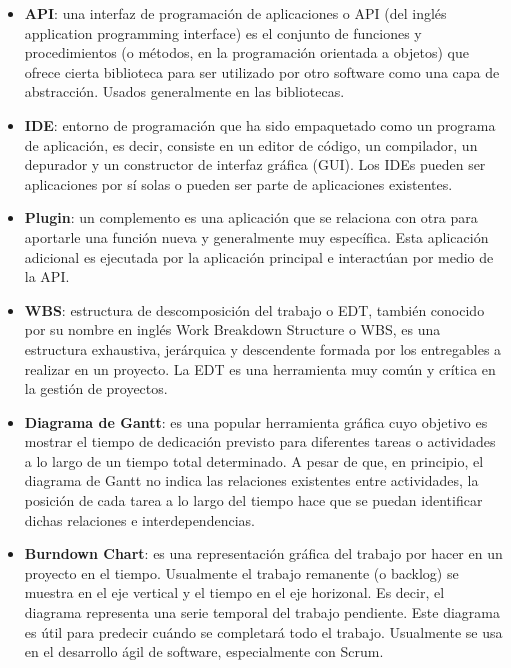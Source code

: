 \documentclass[12pt,a4paper]{article}
\begin{document}
\begin{itemize}

\item \textbf{API}: una interfaz de programación de aplicaciones o API (del inglés application programming interface) es el conjunto de funciones y procedimientos (o métodos, en la programación orientada a objetos) que ofrece cierta biblioteca para ser utilizado por otro software como una capa de abstracción. Usados generalmente en las bibliotecas.

\item \textbf{IDE}: entorno de programación que ha sido empaquetado como un programa de aplicación, es decir, consiste en un editor de código, un compilador, un depurador y un constructor de interfaz gráfica (GUI). Los IDEs pueden ser aplicaciones por sí solas o pueden ser parte de aplicaciones existentes.

\item \textbf{Plugin}: un complemento es una aplicación que se relaciona con otra para aportarle una función nueva y generalmente muy específica. Esta aplicación adicional es ejecutada por la aplicación principal e interactúan por medio de la API.

\item \textbf{WBS}: estructura de descomposición del trabajo o EDT, también conocido por su nombre en inglés Work Breakdown Structure o WBS, es una estructura exhaustiva, jerárquica y descendente formada por los entregables a realizar en un proyecto. La EDT es una herramienta muy común y crítica en la gestión de proyectos.

\item \textbf{Diagrama de Gantt}: es una popular herramienta gráfica cuyo objetivo es mostrar el tiempo de dedicación previsto para diferentes tareas o actividades a lo largo de un tiempo total determinado. A pesar de que, en principio, el diagrama de Gantt no indica las relaciones existentes entre actividades, la posición de cada tarea a lo largo del tiempo hace que se puedan identificar dichas relaciones e interdependencias.

\item \textbf{Burndown Chart}: es una representación gráfica del trabajo por hacer en un proyecto en el tiempo. Usualmente el trabajo remanente (o backlog) se muestra en el eje vertical y el tiempo en el eje horizonal. Es decir, el diagrama representa una serie temporal  del trabajo pendiente. Este diagrama es útil para predecir cuándo se completará todo el trabajo. Usualmente se usa en el desarrollo ágil de software, especialmente con Scrum.

\end{itemize}
\end{document}
